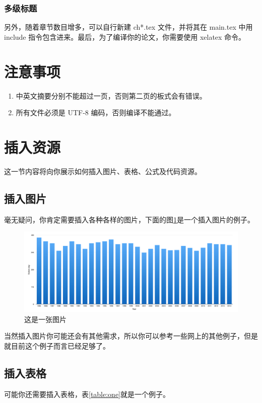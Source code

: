 \subsubsection{多级标题}
另外，随着章节数目增多，可以自行新建 ch*.tex 文件，并将其在 main.tex 中用 include 指令包含进来。最后，为了编译你的论文，你需要使用 xelatex 命令。

\section{注意事项}
\begin{enumerate}
\item 中英文摘要分别不能超过一页，否则第二页的板式会有错误。
\item 所有文件必须是 UTF-8 编码，否则编译不能通过。
\end{enumerate}

\section{插入资源}
这一节内容将向你展示如何插入图片、表格、公式及代码资源。
\subsection{插入图片}
毫无疑问，你肯定需要插入各种各样的图片，下面的图\ref{fig:one}是一个插入图片的例子。

\begin{figure}[htbp!]
\centering
\includegraphics[scale=0.3]{src/img/pic.jpg} 
\caption{这是一张图片}\label{fig:one}
\end{figure}

当然插入图片你可能还会有其他需求，所以你可以参考一些网上的其他例子，但是就目前这个例子而言已经足够了。

\subsection{插入表格}
可能你还需要插入表格，表\ref{table:one}就是一个例子。

